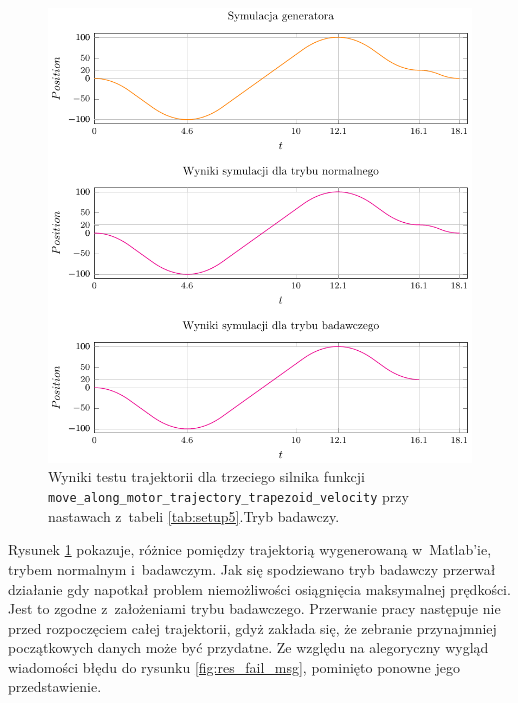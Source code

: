 \documentclass[a4paper, 12pt]{article}
\begin{document}
	\begin{figure}[H]
		\centering
		\includegraphics[scale=1.1]{raport_graphs/simpMTVR.pdf}
		\caption{Wyniki testu trajektorii dla trzeciego silnika funkcji \texttt{move\_along\_motor\_trajectory\_trapezoid\_velocity} przy nastawach z~tabeli \ref{tab:setup5}.Tryb badawczy.}		
		\label{fig:simpMTVR}
	\end{figure}
	Rysunek \ref{fig:simpMTVR} pokazuje, różnice pomiędzy trajektorią wygenerowaną w~Matlab'ie, trybem normalnym i~badawczym. Jak się spodziewano tryb badawczy przerwał działanie gdy napotkał problem niemożliwości osiągnięcia maksymalnej prędkości. Jest to zgodne z~założeniami trybu badawczego. Przerwanie pracy następuje nie przed rozpoczęciem całej trajektorii, gdyż zakłada się, że zebranie przynajmniej początkowych danych może być przydatne. Ze względu na alegoryczny wygląd wiadomości błędu do rysunku \ref{fig:res_fail_msg}, pominięto ponowne jego przedstawienie. 
	 
\end{document}
